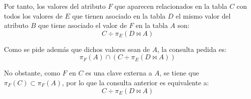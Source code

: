 \documentclass[12pt]{article}
\begin{document}
\begin{ejercicio}[AR]
    Por tanto, los valores del atributo $F$ que aparecen relacionados en la tabla $C$ con todos los valores de $E$ que tienen asociado en la tabla $D$ el mismo valor del atributo $B$ que tiene asociado el valor de $F$ en la tabla $A$ son:
    \begin{equation*}
        C \div \pi_E(D \bowtie A)
    \end{equation*}

    Como se pide además que dichos valores sean de $A$, la consulta pedida es:
    \begin{equation*}
        \pi_F(A) \cap \left( C \div \pi_E(D \bowtie A) \right)
    \end{equation*}

    No obstante, como $F$ en $C$ es una clave externa a $A$, se tiene que $\pi_F(C)\subset \pi_F(A)$, por lo que la consulta anterior es equivalente a:
    \begin{equation*}
        C \div \pi_E(D \bowtie A)
    \end{equation*}
\end{ejercicio}
\end{document}
